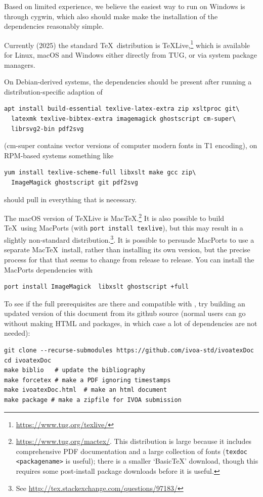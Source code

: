 \documentclass[11pt,a4paper]{ivoa}
\begin{document}
Based on limited experience, we believe the easiest way to run
\ivoatex{} on Windows is through cygwin, which also should make make the
installation of the dependencies reasonably simple.

Currently (2025) the standard \TeX\ distribution is
\TeX Live,\footnote{\url{https://www.tug.org/texlive/}} which is available
for Linux, macOS and Windows either directly from TUG, or via system
package managers.

On Debian-derived systems, the dependencies should be present after
running a distribution-specific adaption of
\begin{lstlisting}
apt install build-essential texlive-latex-extra zip xsltproc git\
  latexmk texlive-bibtex-extra imagemagick ghostscript cm-super\
  librsvg2-bin pdf2svg
\end{lstlisting}
(cm-super contains vector versions of computer modern fonts in T1
encoding), on RPM-based systems something like
\begin{lstlisting}
yum install texlive-scheme-full libxslt make gcc zip\
  ImageMagick ghostscript git pdf2svg
\end{lstlisting}
should pull in everything that is necessary.

The macOS version of \TeX Live is
Mac\TeX.\footnote{\url{https://www.tug.org/mactex/}.  This
distribution is large because it includes comprehensive
PDF documentation and a large collection of fonts (\texttt{texdoc <packagename>} is
useful); there is a smaller `Basic\TeX' download, though this requires
some post-install package downloads before it is useful.}  It is also
possible to build \TeX\ using MacPorts (with \texttt{port install
  texlive}), but this may result in a slightly non-standard
distribution.\footnote{See \url{http://tex.stackexchange.com/questions/97183/}}.
It is possible to persuade MacPorts to use a separate Mac\TeX\ install,
rather than installing its own version,
but the precise process for that that seems to change from release to release.
You can install the MacPorts dependencies with
\begin{lstlisting}
port install ImageMagick  libxslt ghostscript +full
\end{lstlisting}

To see if the full prerequisites are there and compatible with \ivoatex, try
building an updated version of this document from its github source
(normal users can go without making HTML and packages, in which case a
lot of dependencies are not needed):
\begin{lstlisting}[basicstyle=\footnotesize]
git clone --recurse-submodules https://github.com/ivoa-std/ivoatexDoc
cd ivoatexDoc
make biblio   # update the bibliography
make forcetex # make a PDF ignoring timestamps
make ivoatexDoc.html  # make an html document
make package # make a zipfile for IVOA submission
\end{lstlisting}
\end{document}
